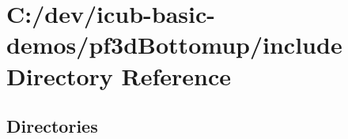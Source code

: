 \section{C\+:/dev/icub-\/basic-\/demos/pf3d\+Bottomup/include Directory Reference}
\label{dir_461bc6e266c40caf4deffca7b613e586}
\subsection*{Directories}
\begin{DoxyCompactItemize}
\end{DoxyCompactItemize}
